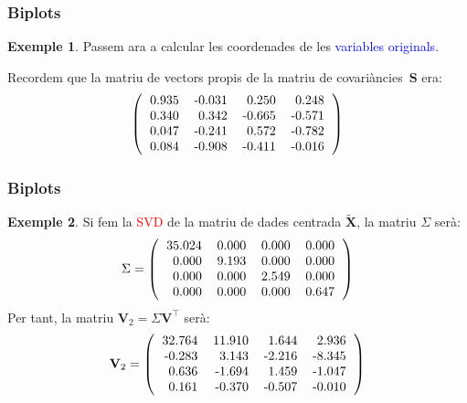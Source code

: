 \documentclass[12pt,t]{beamer}
\newcommand{\red}[1]{\textcolor{red}{#1}}
\newcommand{\blue}[1]{\textcolor{blue}{#1}}
\theoremstyle{plain}
\theoremstyle{definition}
\newtheorem{exemple}{Exemple}
\begin{document}
\begin{frame}
\frametitle{Biplots}
\begin{exemple}
Passem ara a calcular les coordenades de les \blue{variables originals}.
\medskip

Recordem que la matriu de vectors propis de la matriu de covariàncies~$\mathbf{S}$ era:
\[
\left(
\begin{tabular}{rrrr}
  0.935 & -0.031 & 0.250 & 0.248 \\ 
  0.340 & 0.342 & -0.665 & -0.571 \\ 
  0.047 & -0.241 & 0.572 & -0.782 \\ 
  0.084 & -0.908 & -0.411 & -0.016 \\ 
  \end{tabular}\right)
\]
\end{exemple}
\end{frame}

\begin{frame}
\frametitle{Biplots}
\begin{exemple}
Si fem la \red{SVD} de la matriu de dades centrada $\tilde{\mathbf{X}}$, la matriu $\Sigma$ serà:
\[
\Sigma=\left(
\begin{tabular}{rrrr}
  35.024 & 0.000 & 0.000 & 0.000 \\ 
  0.000 & 9.193 & 0.000 & 0.000 \\ 
  0.000 & 0.000 & 2.549 & 0.000 \\ 
  0.000 & 0.000 & 0.000 & 0.647 \\ 
  \end{tabular}\right)
\]
Per tant, la matriu $\mathbf{V}_2 =\Sigma\mathbf{V}^\top$ serà:
\[
\mathbf{V}_2 = \left(
\begin{tabular}{rrrr}
  32.764 & 11.910 & 1.644 & 2.936 \\ 
  -0.283 & 3.143 & -2.216 & -8.345 \\ 
  0.636 & -1.694 & 1.459 & -1.047 \\ 
  0.161 & -0.370 & -0.507 & -0.010 \\ 
  \end{tabular}\right)
\]
\end{exemple}
\end{frame}
\end{document}
